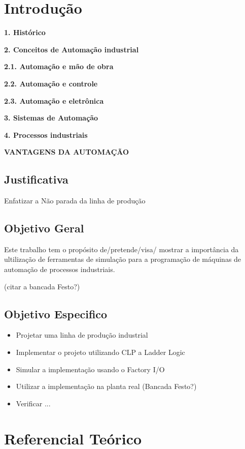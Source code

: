 \documentclass[a4paper, 12pt]{article}
\begin{document}
\section{Introdução}

\textbf{1. Histórico}

\textbf{2. Conceitos de Automação industrial}

\textbf{2.1. Automação e mão de obra}

\textbf{2.2. Automação e controle}

\textbf{2.3. Automação e eletrônica}

\textbf{3. Sistemas de Automação}

\textbf{4. Processos industriais}

\textbf{VANTAGENS DA AUTOMAÇÃO}

\subsection{Justificativa}

Enfatizar a Não parada da linha de produção

\subsection{Objetivo Geral}

Este trabalho tem o propósito de/pretende/visa/ mostrar a importância da 
ultilização de ferramentas de simulação para a programação de máquinas de
automação de processos industriais.

(citar a bancada Festo?)

\subsection{Objetivo Especifico}

\begin{itemize}
  \item Projetar uma linha de produção industrial
  \item Implementar o projeto utilizando CLP a Ladder Logic
  \item Simular a implementação usando o Factory I/O
  \item Utilizar a implementação na planta real (Bancada Festo?)
  \item Verificar ...
\end{itemize}

\section{Referencial Teórico}
\end{document}
